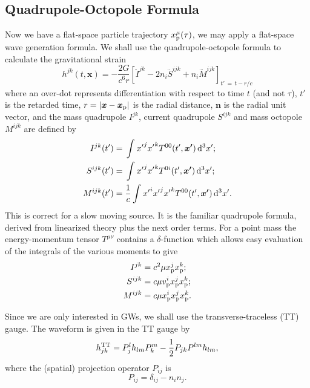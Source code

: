 \subsection{Quadrupole-Octopole Formula}

Now we have a flat-space particle trajectory $x_\mathrm{p}^\mu(\tau)$, we may apply a flat-space wave generation formula. We shall use the quadrupole-octopole formula to calculate the gravitational strain\cite{Press1977, Bekenstein1973}
\begin{equation}
h^{jk}(t, \boldsymbol{x}) = -\frac{2G}{c^6r}\left[\ddot{I}^{jk} - 2n_i\ddot{S}^{ijk} + n_i\dddot{M}^{ijk}\right]_{t'\, =\, t - r/c}
\label{eq:Octopole}
\end{equation}
where an over-dot represents differentiation with respect to time $t$ (and not $\tau$), $t'$ is the retarded time, $r = \left|\boldsymbol{x} - \boldsymbol{x}_\mathrm{p}\right|$ is the radial distance, $\boldsymbol{n}$ is the radial unit vector, and the mass quadrupole ${I}^{jk}$, current quadrupole ${S}^{ijk}$ and mass octopole ${M}^{ijk}$ are defined by
\begin{align}
{I}^{jk}(t') = {} & \int_{}^{}{{x'}^j{x'}^kT^{00}(t', \boldsymbol{x'})}\,\mathrm{d}{^3x'};\\
{S}^{ijk}(t') = {} & \int_{}^{}{{x'}^j{x'}^kT^{0i}(t', \boldsymbol{x'})}\,\mathrm{d}{^3x'};\\
{M}^{ijk}(t') = {} & \frac{1}{c}\int_{}^{}{{x'}^i{x'}^j{x'}^kT^{00}(t', \boldsymbol{x'})}\,\mathrm{d}{^3x'}.
\end{align}
This is correct for a slow moving source. It is the familiar quadrupole formula\cite{Misner1973, Hobson2006}, derived from linearized theory plus the next order terms. For a point mass the energy-momentum tensor $T^{\mu\nu}$ contains a $\delta$-function which allows easy evaluation of the integrals of the various moments to give
\begin{align}
{I}^{jk} = {} & c^2\mu x_\mathrm{p}^jx_\mathrm{p}^k;\\
{S}^{ijk} = {} & c\mu v_\mathrm{p}^ix_\mathrm{p}^jx_\mathrm{p}^k;\\
{M}^{ijk} = {} & c\mu x_\mathrm{p}^ix_\mathrm{p}^jx_\mathrm{p}^k.
\end{align}

Since we are only interested in GWs, we shall use the transverse-traceless (TT) gauge. The waveform is given in the TT gauge by\cite{Misner1973}
\begin{equation}
h^\mathrm{TT}_{jk} = P^l_jh_{lm}P^m_k - \frac{1}{2}P_{jk}P^{lm}h_{lm},
\end{equation}
where the (spatial) projection operator $P_{ij}$ is
\begin{equation}
P_{ij} = \delta_{ij} - n_in_j.
\end{equation}

